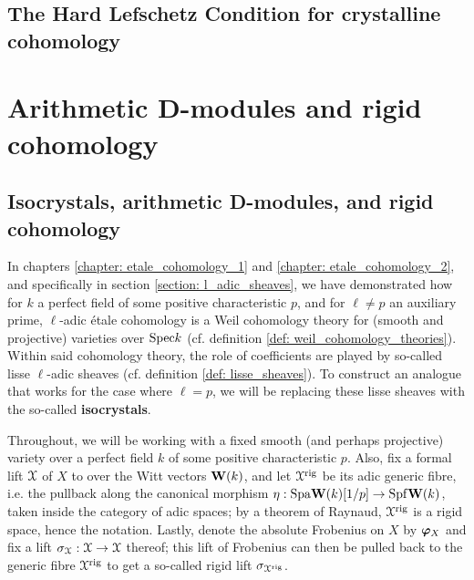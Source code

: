         \subsection{The Hard Lefschetz Condition for crystalline cohomology}
        
    \section{Arithmetic D-modules and rigid cohomology}
        \subsection{Isocrystals, arithmetic D-modules, and rigid cohomology}
            In chapters \ref{chapter: etale_cohomology_1} and \ref{chapter: etale_cohomology_2}, and specifically in section \ref{section: l_adic_sheaves}, we have demonstrated how for $k$ a perfect field of some positive characteristic $p$, and for $\ell \not = p$ an auxiliary prime, $\ell$-adic \'etale cohomology is a Weil cohomology theory for (smooth and projective) varieties over $\mathrm{Spec} k$ (cf. definition \ref{def: weil_cohomology_theories}). Within said cohomology theory, the role of coefficients are played by so-called lisse $\ell$-adic sheaves (cf. definition \ref{def: lisse_sheaves}). To construct an analogue that works for the case where $\ell = p$, we will be replacing these lisse sheaves with the so-called \textbf{isocrystals}.
            
            \begin{convention}
                Throughout, we will be working with a fixed smooth (and perhaps projective) variety over a perfect field $k$ of some positive characteristic $p$. Also, fix a formal lift $\mathcal{X}$ of $X$ to over the Witt vectors $\mathbf{W}(k)$, and let $\mathcal{X}^{\mathrm{rig}}$ be its adic generic fibre, i.e. the pullback along the canonical morphism $\eta: \mathrm{Spa}\mathbf{W}(k)[1/p] \to \mathrm{Spf}\mathbf{W}(k)$, taken inside the category of adic spaces; by a theorem of Raynaud, $\mathcal{X}^{\mathrm{rig}}$ is a rigid space, hence the notation. Lastly, denote the absolute Frobenius on $X$ by $\bm{\varphi}_X$ and fix a lift $\sigma_{\mathcal{X}}: \mathcal{X} \to \mathcal{X}$ thereof; this lift of Frobenius can then be pulled back to the generic fibre $\mathcal{X}^{\mathrm{rig}}$ to get a so-called rigid lift $\sigma_{\mathcal{X}^{\mathrm{rig}}}$.
            \end{convention}
            
